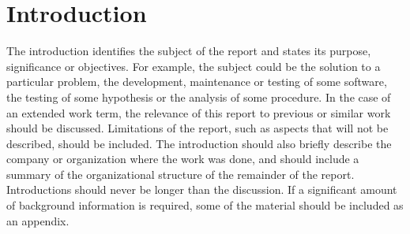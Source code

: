 \section{Introduction}
The introduction identifies the subject of the report and states its purpose, significance or objectives. For example, the subject could be the solution to a particular problem, the development, maintenance or testing of some software, the testing of some hypothesis or the analysis of some procedure. In the case of an extended work term, the relevance of this report to previous or similar work should be discussed. Limitations of the report, such as aspects that will not be described, should be included. The introduction should also briefly describe the company or organization where the work was done, and should include a summary of the organizational structure of the remainder of the report. Introductions should never be longer than the discussion. If a significant amount of background information is required, some of the material should be included as an appendix.
